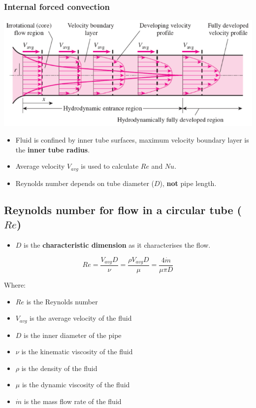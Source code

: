 \documentclass[11pt]{article}
\begin{document}
\subsubsection{Internal forced convection}
\label{sec:org6c7defc}
\begin{center}
\includegraphics[width=.9\linewidth]{./images/circular-pipe-flow.png}
\end{center}
\begin{itemize}
\item Fluid is confined by inner tube surfaces, maximum velocity boundary layer is the \textbf{inner tube radius}.
\item Average velocity \(V_{avg}\) is used to calculate \(Re\) and \(Nu\).
\item Reynolds number depends on tube diameter (\(D\)), \textbf{not} pipe length.
\end{itemize}

 \newpage
\subsection{Reynolds number for flow in a circular tube (\(Re\))}
\label{sec:org2472eb4}
\begin{itemize}
\item \(D\) is the \textbf{characteristic dimension} as it characterises the flow.
\end{itemize}
\[Re = \frac{V_{avg} D}{\nu} = \frac{\rho V_{avg} D}{\mu} = \frac{4 \dot{m}}{\mu \pi D}\]

Where:
\begin{itemize}
\item \(Re\) is the Reynolds number
\item \(V_{avg}\) is the average velocity of the fluid
\item \(D\) is the inner diameter of the pipe
\item \(\nu\) is the kinematic viscosity of the fluid
\item \(\rho\) is the density of the fluid
\item \(\mu\) is the dynamic viscosity of the fluid
\item \(\dot{m}\) is the mass flow rate of the fluid
\end{itemize}
\end{document}
